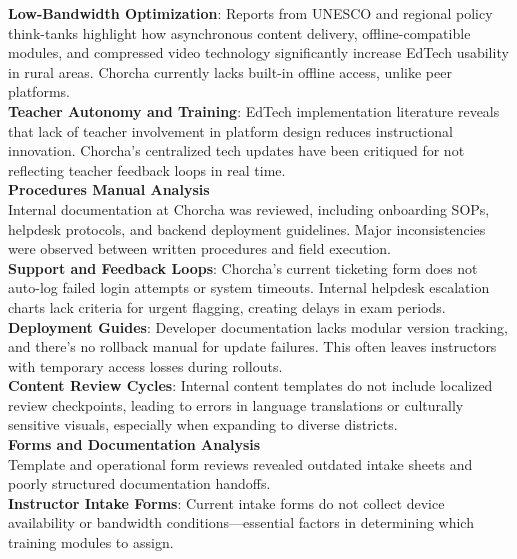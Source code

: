 \documentclass[12pt,a4paper,oneside]{book}
\begin{document}
\textbf{Low-Bandwidth Optimization}: Reports from UNESCO and regional policy think-tanks highlight how asynchronous content delivery, offline-compatible modules, and compressed video technology significantly increase EdTech usability in rural areas. Chorcha currently lacks built-in offline access, unlike peer platforms.\\

\textbf{Teacher Autonomy and Training}: EdTech implementation literature reveals that lack of teacher involvement in platform design reduces instructional innovation. Chorcha's centralized tech updates have been critiqued for not reflecting teacher feedback loops in real time.\\

\textbf{Procedures Manual Analysis} \\
Internal documentation at Chorcha was reviewed, including onboarding SOPs, helpdesk protocols, and backend deployment guidelines. Major inconsistencies were observed between written procedures and field execution.\\

\textbf{Support and Feedback Loops}: Chorcha’s current ticketing form does not auto-log failed login attempts or system timeouts. Internal helpdesk escalation charts lack criteria for urgent flagging, creating delays in exam periods.\\

\textbf{Deployment Guides}: Developer documentation lacks modular version tracking, and there’s no rollback manual for update failures. This often leaves instructors with temporary access losses during rollouts.\\

\textbf{Content Review Cycles}: Internal content templates do not include localized review checkpoints, leading to errors in language translations or culturally sensitive visuals, especially when expanding to diverse districts.\\

\textbf{Forms and Documentation Analysis} \\
Template and operational form reviews revealed outdated intake sheets and poorly structured documentation handoffs.\\

\textbf{Instructor Intake Forms}: Current intake forms do not collect device availability or bandwidth conditions—essential factors in determining which training modules to assign.\\
\end{document}
